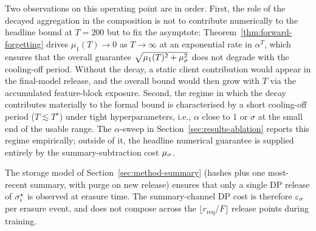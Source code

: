 Two observations on this operating point are in order. First, the role of the decayed
aggregation in the composition is not to contribute numerically to the headline bound
at $T = 200$ but to fix the asymptote: Theorem~\ref{thm:forward-forgetting} drives
$\mu_1(T) \to 0$ as $T \to \infty$ at an exponential rate in $\alpha^T$, which ensures
that the overall guarantee $\sqrt{\mu_1(T)^2 + \mu_\sigma^2}$ does not degrade with
the cooling-off period. Without the decay, a static client contribution would appear in
the final-model release, and the overall bound would then grow with $T$ via the
accumulated feature-block exposure. Second, the regime in which the decay contributes
materially to the formal bound is characterised by a short cooling-off period
($T \lesssim T^\star$) under tight hyperparameters, i.e., $\alpha$ close to 1 or
$\sigma$ at the small end of the usable range. The $\alpha$-sweep in
Section~\ref{sec:results-ablation} reports this regime empirically; outside of it, the
headline numerical guarantee is supplied entirely by the summary-subtraction cost
$\mu_\sigma$.

The storage model of Section~\ref{sec:method-summary} (hashes plus one most-recent
summary, with purge on new release) ensures that only a single DP release of
$\sigma_i^{\star}$ is observed at erasure time. The summary-channel DP cost is therefore
$\varepsilon_\sigma$ per erasure event, and does not compose across the $\lfloor
r_\mathrm{req} / F \rfloor$ release points during training.
